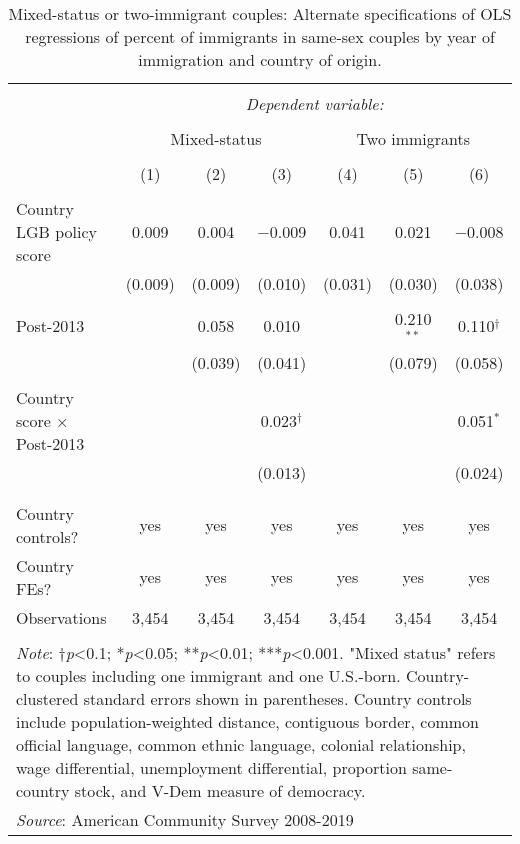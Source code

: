 \documentclass[
  11pt,
]{article}
\begin{document}
\begin{table}[H] \centering 
  \caption{Mixed-status or two-immigrant couples: Alternate specifications of OLS regressions of percent of immigrants in same-sex couples by year of immigration and country of origin.} 
  \label{tab:country-props-alt2} 
\begin{tabular}{@{\extracolsep{5pt}}lcccccc} 
\\[-1.8ex]\hline 
\hline \\[-1.8ex] 
 & \multicolumn{6}{c}{\textit{Dependent variable:}} \\ 
\cline{2-7} 
\\[-1.8ex] & \multicolumn{3}{c}{Mixed-status} & \multicolumn{3}{c}{Two immigrants} \\ 
\\[-1.8ex] & (1) & (2) & (3) & (4) & (5) & (6)\\ 
\hline \\[-1.8ex] 
 Country LGB policy score & 0.009 & 0.004 & $-$0.009 & 0.041 & 0.021 & $-$0.008 \\ 
  & (0.009) & (0.009) & (0.010) & (0.031) & (0.030) & (0.038) \\ 
  & & & & & & \\ 
 Post-2013 &  & 0.058 & 0.010 &  & 0.210$^{**}$ & 0.110$^{†}$ \\ 
  &  & (0.039) & (0.041) &  & (0.079) & (0.058) \\ 
  & & & & & & \\ 
 Country score × Post-2013 &  &  & 0.023$^{†}$ &  &  & 0.051$^{*}$ \\ 
  &  &  & (0.013) &  &  & (0.024) \\ 
  & & & & & & \\ 
\hline \\[-1.8ex] 
Country controls? & yes & yes & yes & yes & yes & yes \\ 
Country FEs? & yes & yes & yes & yes & yes & yes \\ 
Observations & 3,454 & 3,454 & 3,454 & 3,454 & 3,454 & 3,454 \\ 
\hline 
\hline \\[-1.8ex] 
\multicolumn{7}{l}{\parbox[t]{\textwidth}{\textit{Note}: †\textit{p}<0.1; *\textit{p}<0.05; **\textit{p}<0.01; ***\textit{p}<0.001. "Mixed status" refers to couples including one immigrant and one U.S.-born. Country-clustered standard errors shown in parentheses. Country controls include population-weighted distance, contiguous border, common official language, common ethnic language, colonial relationship, wage differential, unemployment differential, proportion same-country stock, and V-Dem measure of democracy.}} \\ 
\multicolumn{7}{l}{\textit{Source}: American Community Survey 2008-2019} \\ 
\end{tabular} 
\end{table}
\end{document}
